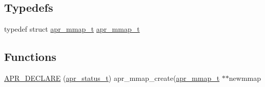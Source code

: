 \subsection*{Typedefs}
\begin{DoxyCompactItemize}
\item 
typedef struct \hyperlink{structapr__mmap__t}{apr\+\_\+mmap\+\_\+t} \hyperlink{group__apr__mmap_ga766b01a3e1e0438d06dc88d76f826f80}{apr\+\_\+mmap\+\_\+t}
\end{DoxyCompactItemize}
\subsection*{Functions}
\begin{DoxyCompactItemize}
\item 
\hyperlink{group__apr__mmap_gaeb8f7ba16ca9de201e39171961ca5a69}{A\+P\+R\+\_\+\+D\+E\+C\+L\+A\+RE} (\hyperlink{group__apr__errno_gaa5105fa83cc322f09382292db8b47593}{apr\+\_\+status\+\_\+t}) apr\+\_\+mmap\+\_\+create(\hyperlink{structapr__mmap__t}{apr\+\_\+mmap\+\_\+t} $\ast$$\ast$newmmap
\end{DoxyCompactItemize}
